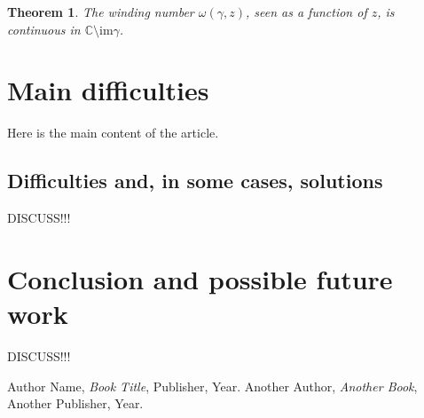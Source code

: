 \documentclass[a4paper,12pt]{article}
\newtheorem{theorem}{Theorem}
\begin{document}
\begin{theorem}
  The winding number $\omega(\gamma, z)$, seen as a function of $z$, is continuous in $\mathbb{C}\setminus \text{im}\gamma$.
\end{theorem}
\section{Main difficulties}
Here is the main content of the article.

\subsection{Difficulties and, in some cases, solutions}
DISCUSS!!!

\section{Conclusion and possible future work}
DISCUSS!!!

\begin{thebibliography}{9}
 Author Name, \textit{Book Title}, Publisher, Year.
 Another Author, \textit{Another Book}, Another Publisher, Year.
\end{thebibliography}
\end{document}

